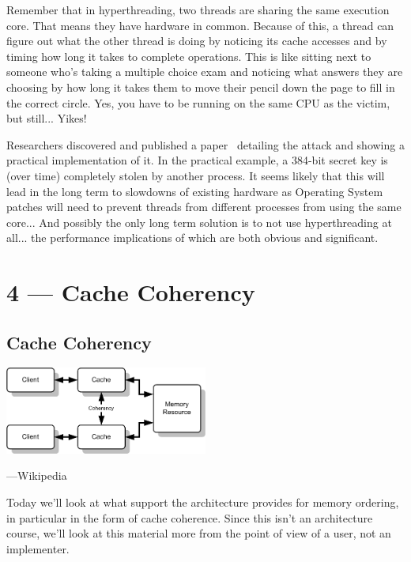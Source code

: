 \documentclass[a4paper]{report}
\begin{document}
Remember that in hyperthreading, two threads are sharing the same execution core. That means they have hardware in common. Because of this, a thread can figure out what the other thread is doing by noticing its cache accesses and by timing how long it takes to complete operations. This is like sitting next to someone who's taking a multiple choice exam and noticing what answers they are choosing by how long it takes them to move their pencil down the page to fill in the correct circle. Yes, you have to be running on the same CPU as the victim, but still... Yikes! 

Researchers discovered and published a paper~\cite{portsmash} detailing the attack and showing a practical implementation of it. In the practical example, a 384-bit secret key is (over time) completely stolen by another process. It seems likely that this will lead in the long term to slowdowns of existing hardware as Operating System patches will need to prevent threads from different processes from using the same core... And possibly the only long term solution is to not use hyperthreading at all... the performance implications of which are both obvious and significant.









\chapter*{4 --- Cache Coherency}


\section*{Cache Coherency}

\begin{center}
    \includegraphics[width=0.5\textwidth]{images/coherency}

\hfill ---Wikipedia
\end{center}

Today we'll look at what support the architecture provides for memory ordering, in
particular in the form of cache coherence. Since this isn't an
architecture course, we'll look at this material more from the point
of view of a user, not an implementer.
\end{document}
